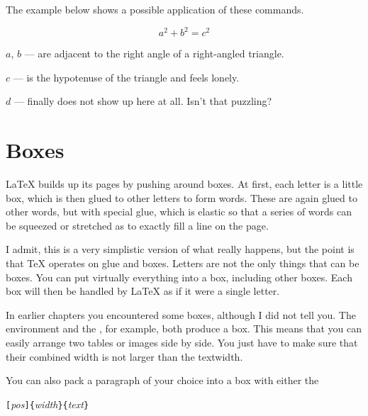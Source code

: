 \noindent The example below shows a possible application of these commands.

\begin{example}[examplewidth=0.45\linewidth]
\newenvironment{vardesc}[1]{%
  \settowidth{\parindent}{#1:\ }
  \makebox[0pt][r]{#1:\ }}{}

\begin{displaymath}
a^2+b^2=c^2
\end{displaymath}

\begin{vardesc}{Where}$a$,
$b$ --- are adjacent to the right
angle of a right-angled triangle.

$c$ --- is the hypotenuse of
the triangle and feels lonely.

$d$ --- finally does not show up
here at all. Isn't that puzzling?
\end{vardesc}
\end{example}

\section{Boxes}
\LaTeX{} builds up its pages by pushing around boxes. At first, each
letter is a little box, which is then glued to other letters to form
words. These are again glued to other words, but with special glue,
which is elastic so that a series of words can be squeezed or
stretched as to exactly fill a line on the page.

I admit, this is a very simplistic version of what really happens, but the
point is that \TeX{} operates on glue and boxes. Letters are not the only
things that can be boxes. You can put virtually everything into a box,
including other boxes. Each box will then be handled by \LaTeX{} as if it
were a single letter.

In earlier chapters you encountered some boxes, although I did
not tell you. The  environment and the , for
example, both produce a box. This means that you can easily arrange two
tables or images side by side. You just have to make sure that their
combined width is not larger than the textwidth.

You can also pack a paragraph of your choice into a box with either
the

\begin{lscommand}
  \verb|[|\emph{pos}\verb|]{|\emph{width}\verb|}{|\emph{text}\verb|}|
\end{lscommand}

